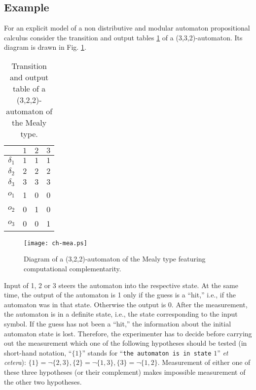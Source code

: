 \documentclass{article}
\begin{document}
\subsection{Example}
 For an explicit model of a
 non distributive and modular
 automaton
 propositional calculus
 consider the
 transition and output tables \ref{t-mealy-a} of a
(3,3,2)-automaton. Its diagram is drawn in Fig. \ref{fig:1}.
\begin{table}
\begin{tabular}{||c||ccc||}
 \hline\hline
   &  $1$ & $2$ & $3$  \\
 \hline
 $\delta_1$ &$1$&$1$&$1$\\
 $\delta_2$ &$2$&$2$&$2$\\
 $\delta_3$ &$3$&$3$&$3$\\
 \hline
 $o_1$ &1&0&0\\
 $o_2$ &0&1&0\\
 $o_3$ &0&0&1\\
 \hline\hline
\end{tabular}
\caption{Transition and output table of a
 (3,2,2)-automaton of the Mealy type.
 \label{t-mealy-a}}
 \end{table}
 \begin{figure}
\texttt{[image: ch-mea.ps]}
 \caption{Diagram
 of  a  (3,2,2)-automaton
 of the Mealy type featuring
computational complementarity.
\label{fig:1}}
\end{figure}

 Input of 1, 2 or 3 steers the automaton into the respective state. At
 the same time, the output of the automaton is 1 only if the guess is a
 ``hit,'' i.e., if the automaton was in that state. Otherwise the
 output is 0.   After the measurement, the automaton is in a
 definite state, i.e., the state corresponding to the input symbol.
 If the guess has not been a
``hit,'' the information about
 the initial automaton state is lost.
 Therefore, the experimenter has to decide before carrying out the
measurement which one of the following
 hypotheses should be tested (in short-hand notation, ``$\{
1\}$'' stands for ``{\tt the automaton is in state} $1$'' {\it et
cetera}):
$
\{ 1 \}=
\neg
\{ 2,3 \},
\{ 2 \}=
\neg
\{ 1,3 \},
\{ 3 \}=
\neg
\{ 1,2 \}
$.
Measurement of either one of these three hypotheses (or their
complement) makes impossible measurement of the other two hypotheses.
\end{document}
